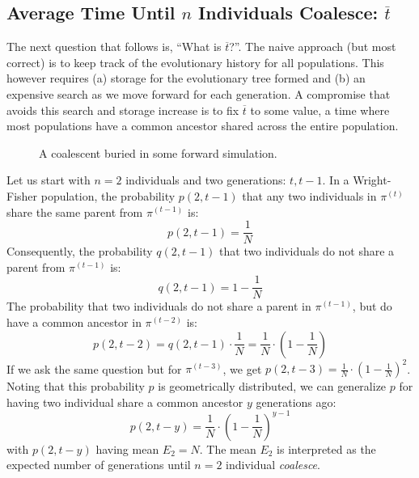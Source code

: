 \subsection{Average Time Until $n$ Individuals Coalesce: $\overbar{t}$}
\label{subsec:averageTimeUntilNIndividualsCoalesce}
The next question that follows is, ``What is $\overbar{t}$?''.
The naive approach (but most correct) is to keep track of the evolutionary history for all populations.
This however requires (a) storage for the evolutionary tree formed and (b) an expensive search as we move forward for
each generation.
A compromise that avoids this search and storage increase is to fix $\overbar{t}$ to some value, a time where most
populations have a common ancestor shared across the entire population.

\begin{figure}[t]
    \centering
    \subfloat{{  }}
    \qquad \qquad \qquad
    \subfloat{{  }}
    \caption{A coalescent buried in some forward simulation.}
    \label{fig:coalescentBuried}
\end{figure}

Let us start with $n=2$ individuals and two generations: $t, t-1$.
In a Wright-Fisher population, the probability $p(2, t-1)$ that any two individuals in $\pi^{(t)}$ share the same
parent from $\pi^{(t-1)}$ is:
\begin{equation}
    p(2, t-1) = \frac{1}{N}
\end{equation}
Consequently, the probability $q(2, t-1)$ that two individuals do not share a parent from $\pi^{(t-1)}$ is:
\begin{equation}
    q(2, t-1) = 1 - \frac{1}{N}
\end{equation}
The probability that two individuals do not share a parent in $\pi^{(t-1)}$, but do have a common ancestor
in $\pi^{(t-2)}$ is:
\begin{equation}
    p(2, t-2) = q(2, t-1) \cdot \frac{1}{N} = \frac{1}{N} \cdot \left(1 - \frac{1}{N}\right)
\end{equation}
If we ask the same question but for $\pi^{(t-3)}$, we get
$p(2, t-3) = \frac{1}{N} \cdot  \left(1 - \frac{1}{N}\right)^2$.
Noting that this probability $p$ is geometrically distributed, we can generalize $p$ for having two individual share a
common ancestor $y$ generations ago:
\begin{equation}
    p(2, t-y) = \frac{1}{N} \cdot \left(1 - \frac{1}{N}\right)^{y-1}
\end{equation}
with $p(2, t-y)$ having mean $E_2 = N$.
The mean $E_2$ is interpreted as the expected number of generations until $n=2$ individual \emph{coalesce}.

